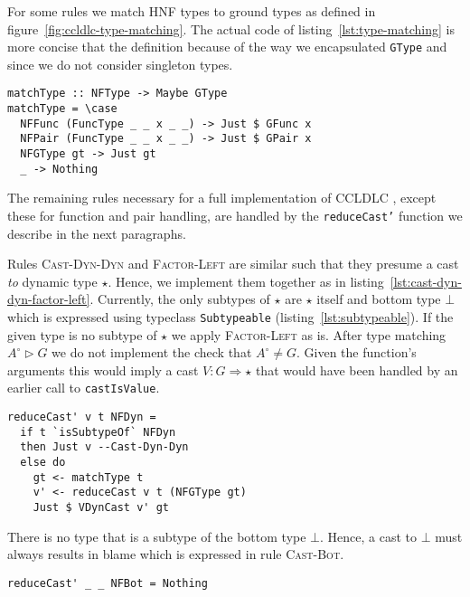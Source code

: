 For some rules we match HNF types to ground types as defined in figure~\ref{fig:ccldlc-type-matching}. The actual code of listing~\ref{lst:type-matching} is more concise that the definition because of the way we encapsulated \texttt{GType} and since we do not consider singleton types.

\begin{lstlisting}[float,
  caption=Type matching $A^\circ \rhd G$ (\texttt{Interpreter.hs}),
  label=lst:type-matching]
matchType :: NFType -> Maybe GType
matchType = \case
  NFFunc (FuncType _ _ x _ _) -> Just $ GFunc x
  NFPair (FuncType _ _ x _ _) -> Just $ GPair x
  NFGType gt -> Just gt
  _ -> Nothing
\end{lstlisting}

The remaining rules necessary for a full implementation of CCLDLC , except these for function and pair handling, are handled by the \texttt{reduceCast'} function we describe in the next paragraphs.

Rules \textsc{Cast-Dyn-Dyn} and \textsc{Factor-Left} are similar such that they presume a cast \emph{to} dynamic type $\star$. Hence, we implement them together as in listing~\ref{lst:cast-dyn-dyn-factor-left}. Currently, the only subtypes of $\star$ are $\star$ itself and bottom type $\bot$ which is expressed using typeclass \texttt{Subtypeable} (listing~\ref{lst:subtypeable}). If the given type is no subtype of $\star$ we apply \textsc{Factor-Left} as is. After type matching $A^\circ \rhd G$ we do not implement the check that $A^\circ \neq G$. Given the function's arguments this would imply a cast $V : G \Rightarrow \star$ that would have been handled by an earlier call to \texttt{castIsValue}.

\begin{lstlisting}[float,
  label=lst:cast-dyn-dyn-factor-left,
  caption=Rules \textsc{Cast-Dyn-Dyn} and \textsc{Factor-Left} (\texttt{Interpreter.hs})]
reduceCast' v t NFDyn =
  if t `isSubtypeOf` NFDyn
  then Just v --Cast-Dyn-Dyn
  else do
    gt <- matchType t
    v' <- reduceCast v t (NFGType gt)
    Just $ VDynCast v' gt
\end{lstlisting}

There is no type that is a subtype of the bottom type $\bot$. Hence, a cast to $\bot$ must always results in blame which is expressed in rule \textsc{Cast-Bot}.

\begin{lstlisting}[caption=Rule \textsc{Cast-Bot} (\texttt{Interpreter.hs})]
reduceCast' _ _ NFBot = Nothing
\end{lstlisting}

